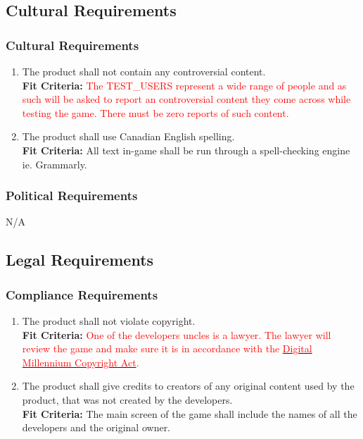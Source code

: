 \documentclass[12pt, titlepage]{article}
\begin{document}
\subsection{Cultural Requirements}

\subsubsection{Cultural Requirements}
\begin{enumerate}[{CR}1. ]
    \item The product shall not contain any controversial content.\\
    \textbf{Fit Criteria:} \textcolor{red}{The TEST\_USERS represent a wide range of people and as such will be asked to report an controversial content they come across while testing the game. There must be zero reports of such content.}
    \item The product shall use Canadian English spelling.\\
    \textbf{Fit Criteria:} All text in-game shall be run through a spell-checking engine ie. Grammarly.
\end{enumerate}

\subsubsection{Political Requirements}
N/A



\subsection{Legal Requirements}

\subsubsection{Compliance Requirements}
\begin{enumerate}[{LR}1. ]
    \item The product shall not violate copyright.\\
    \textbf{Fit Criteria:} \textcolor{red}{One of the developers uncles is a lawyer. The lawyer will review the game and make sure it is in accordance with the \href{https://www.copyright.gov/legislation/dmca.pdf}{\textcolor{red}{Digital Millennium Copyright Act}}.}
    \item The product shall give credits to creators of any original content used by the product, that was not created by the developers.\\
    \textbf{Fit Criteria:} The main screen of the game shall include the names of all the developers and the original owner.
\end{enumerate}
\end{document}
